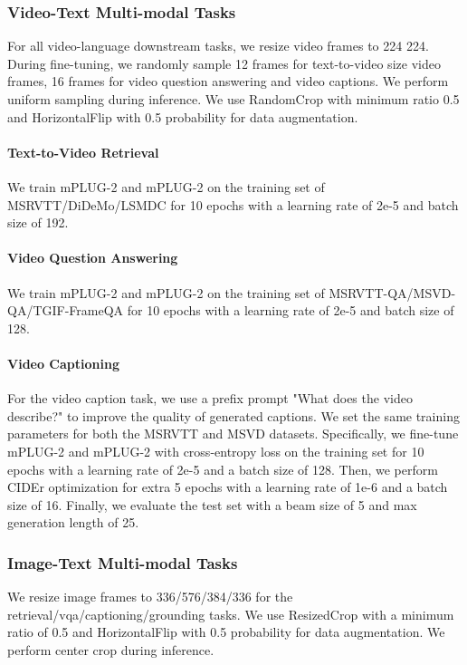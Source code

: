 \documentclass{article}
\theoremstyle{plain}
\theoremstyle{definition}
\theoremstyle{remark}
\newcommand{\modelname}{mPLUG-2 }
\newcommand{\modelnamebase}{mPLUG-2 }
\begin{document}
\subsubsection{Video-Text Multi-modal Tasks}

For all video-language downstream tasks, we resize video frames to 224  224. 
During fine-tuning, we randomly sample 12 frames for text-to-video size video frames, 16 frames for video question answering and video captions. 
We perform uniform sampling during inference. 
We use RandomCrop with minimum ratio 0.5 and HorizontalFlip with 0.5 probability for data augmentation.

\paragraph{Text-to-Video Retrieval}
We train \modelnamebase and \modelname on the training set of MSRVTT/DiDeMo/LSMDC for 10 epochs with a learning rate of 2e-5 and batch size of 192.

\paragraph{Video Question Answering}
We train \modelnamebase and \modelname on the training set of MSRVTT-QA/MSVD-QA/TGIF-FrameQA for 10 epochs with a learning rate of 2e-5 and batch size of 128.

\paragraph{Video Captioning}
For the video caption task, we use a prefix prompt "What does the video describe?" to improve the quality of generated captions.
We set the same training parameters for both the MSRVTT and MSVD datasets. Specifically, we fine-tune \modelnamebase and \modelname with cross-entropy loss on the training set for 10 epochs with a learning rate of 2e-5 and a batch size of 128.
Then, we perform CIDEr optimization for extra 5 epochs with a learning rate of 1e-6 and a batch size of 16.
Finally, we evaluate the test set with a beam size of 5 and max generation length of 25.

\subsubsection{Image-Text Multi-modal Tasks}

We resize image frames to 336/576/384/336 for the retrieval/vqa/captioning/grounding tasks.
We use ResizedCrop with a minimum ratio of 0.5 and HorizontalFlip with 0.5 probability for data augmentation.
We perform center crop during inference. 
\end{document}
